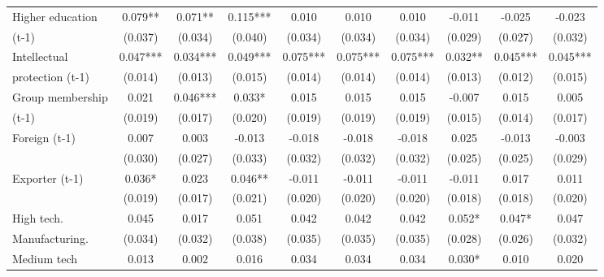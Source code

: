 \begin{table}[htbp]
\begin{tabular}{l*{9}{c}}
Higher education    &       0.079** &       0.071** &       0.115***&       0.010   &       0.010   &       0.010   &      -0.011   &      -0.025   &      -0.023   \\
(t-1)               &     (0.037)   &     (0.034)   &     (0.040)   &     (0.034)   &     (0.034)   &     (0.034)   &     (0.029)   &     (0.027)   &     (0.032)   \\
Intellectual        &       0.047***&       0.034***&       0.049***&       0.075***&       0.075***&       0.075***&       0.032** &       0.045***&       0.045***\\
protection (t-1)    &     (0.014)   &     (0.013)   &     (0.015)   &     (0.014)   &     (0.014)   &     (0.014)   &     (0.013)   &     (0.012)   &     (0.015)   \\
Group membership    &       0.021   &       0.046***&       0.033*  &       0.015   &       0.015   &       0.015   &      -0.007   &       0.015   &       0.005   \\
(t-1)               &     (0.019)   &     (0.017)   &     (0.020)   &     (0.019)   &     (0.019)   &     (0.019)   &     (0.015)   &     (0.014)   &     (0.017)   \\
Foreign (t-1)       &       0.007   &       0.003   &      -0.013   &      -0.018   &      -0.018   &      -0.018   &       0.025   &      -0.013   &      -0.003   \\
                    &     (0.030)   &     (0.027)   &     (0.033)   &     (0.032)   &     (0.032)   &     (0.032)   &     (0.025)   &     (0.025)   &     (0.029)   \\
Exporter (t-1)      &       0.036*  &       0.023   &       0.046** &      -0.011   &      -0.011   &      -0.011   &      -0.011   &       0.017   &       0.011   \\
                    &     (0.019)   &     (0.017)   &     (0.021)   &     (0.020)   &     (0.020)   &     (0.020)   &     (0.018)   &     (0.018)   &     (0.020)   \\
High tech.          &       0.045   &       0.017   &       0.051   &       0.042   &       0.042   &       0.042   &       0.052*  &       0.047*  &       0.047   \\
Manufacturing.      &     (0.034)   &     (0.032)   &     (0.038)   &     (0.035)   &     (0.035)   &     (0.035)   &     (0.028)   &     (0.026)   &     (0.032)   \\
Medium tech         &       0.013   &       0.002   &       0.016   &       0.034   &       0.034   &       0.034   &       0.030*  &       0.010   &       0.020   \\

\end{tabular}
\end{table}
